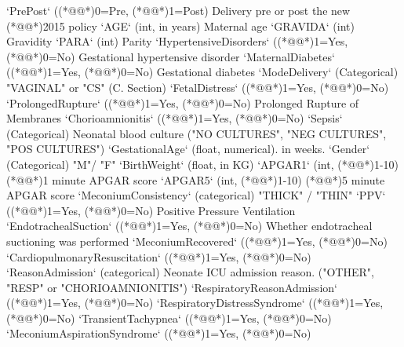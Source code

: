 \documentclass[11pt]{article}
\begin{document}
\begin{codeoutput}
`PrePost` ((*@@*)0=Pre, (*@@*)1=Post) Delivery pre or post the new (*@@*)2015 policy
`AGE` (int, in years) Maternal age
`GRAVIDA` (int) Gravidity
`PARA` (int) Parity
`HypertensiveDisorders` ((*@@*)1=Yes, (*@@*)0=No) Gestational hypertensive disorder
`MaternalDiabetes`	((*@@*)1=Yes, (*@@*)0=No) Gestational diabetes
`ModeDelivery` (Categorical) "VAGINAL" or "CS" (C. Section)
`FetalDistress` ((*@@*)1=Yes, (*@@*)0=No)
`ProlongedRupture` ((*@@*)1=Yes, (*@@*)0=No) Prolonged Rupture of Membranes
`Chorioamnionitis` ((*@@*)1=Yes, (*@@*)0=No)
`Sepsis` (Categorical) Neonatal blood culture ("NO CULTURES", "NEG CULTURES", "POS CULTURES")
`GestationalAge` (float, numerical). in weeks.
`Gender` (Categorical) "M"/ "F"
`BirthWeight` (float, in KG)
`APGAR1` (int, (*@@*)1-10) (*@@*)1 minute APGAR score
`APGAR5` (int, (*@@*)1-10) (*@@*)5 minute APGAR score
`MeconiumConsistency` (categorical) "THICK" / "THIN"
`PPV` ((*@@*)1=Yes, (*@@*)0=No) Positive Pressure Ventilation
`EndotrachealSuction` ((*@@*)1=Yes, (*@@*)0=No) Whether endotracheal suctioning was performed
`MeconiumRecovered` ((*@@*)1=Yes, (*@@*)0=No)
`CardiopulmonaryResuscitation` ((*@@*)1=Yes, (*@@*)0=No)
`ReasonAdmission` (categorical) Neonate ICU admission reason. ("OTHER", "RESP" or "CHORIOAMNIONITIS")
`RespiratoryReasonAdmission` ((*@@*)1=Yes, (*@@*)0=No)
`RespiratoryDistressSyndrome` ((*@@*)1=Yes, (*@@*)0=No)
`TransientTachypnea` ((*@@*)1=Yes, (*@@*)0=No)
`MeconiumAspirationSyndrome` ((*@@*)1=Yes, (*@@*)0=No)

\end{codeoutput}
\end{document}
